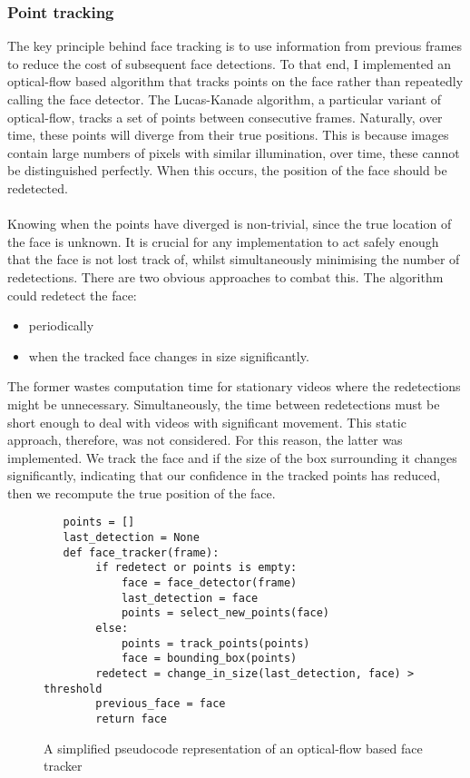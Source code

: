 \subsubsection{Point tracking}
The key principle behind face tracking is to use information from previous frames to reduce the cost of subsequent face detections.
To that end, I implemented an optical-flow based algorithm that tracks points on the face rather than repeatedly calling the face detector. The Lucas-Kanade algorithm, a particular variant of optical-flow, tracks a set of points between consecutive frames. Naturally, over time, these points will diverge from their true positions. This is because images contain large numbers of pixels with similar illumination, over time, these cannot be distinguished perfectly. When this occurs, the position of the face should be redetected. 
\\ \\
Knowing when the points have diverged is non-trivial, since the true location of the face is unknown. It is crucial for any implementation to act safely enough that the face is not lost track of, whilst simultaneously minimising the number of redetections.
There are two obvious approaches to combat this. The algorithm could redetect the face: 
\begin{itemize}
    \item periodically 
    \item when the tracked face changes in size significantly. 
\end{itemize}
The former wastes computation time for stationary videos where the redetections might be unnecessary. Simultaneously, the time between redetections must be short enough to deal with videos with significant movement. This static approach, therefore, was not considered. For this reason, the latter was implemented. We track the face and if the size of the box surrounding it changes significantly, indicating that our confidence in the tracked points has reduced, then we recompute the true position of the face.
\begin{figure}[!h]
\begin{verbatim}
   points = []
   last_detection = None
   def face_tracker(frame):
        if redetect or points is empty:
            face = face_detector(frame) 
            last_detection = face
            points = select_new_points(face)
        else:
            points = track_points(points)
            face = bounding_box(points)
        redetect = change_in_size(last_detection, face) > threshold
        previous_face = face
        return face
\end{verbatim}
\caption{A simplified pseudocode representation of an optical-flow based face tracker}
\end{figure} 
